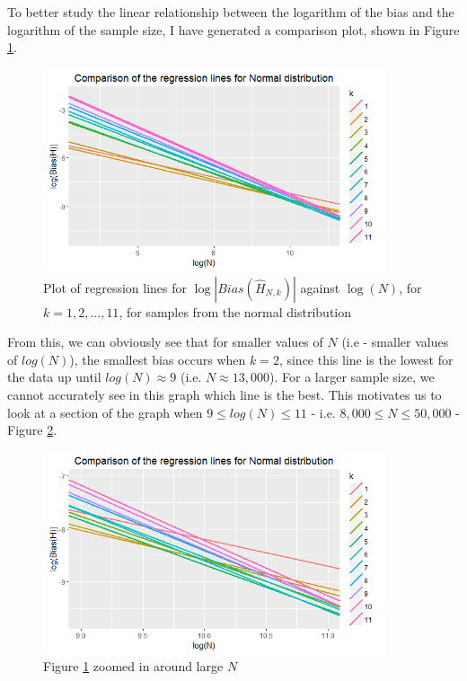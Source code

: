 \documentclass[12pt]{report}
\begin{document}
To better study the linear relationship between the logarithm of the bias and the logarithm of the sample size, I have generated a comparison plot, shown in Figure \ref{normal_comparison_graph}. 

\begin{figure}
  \begin{center}
    \includegraphics[width=0.9\textwidth]{./Graphs/Best/NormalComparison.png}
  \end{center}
\caption{Plot of regression lines for $\log|Bias(\hat{H}_{N, k})|$ against $\log(N)$, for $k=1, 2,..., 11$, for samples from the normal distribution}
  \label{normal_comparison_graph}
\end{figure}

From this, we can obviously see that for smaller values of $N$ (i.e - smaller values of $log(N)$), the smallest bias occurs when $k=2$, since this line is the lowest for the data up until $log(N) \approx 9$ (i.e. $N \approx 13,000$). For a larger sample size, we cannot accurately see in this graph which line is the best. This motivates us to look at a section of the graph when $9 \leq log(N) \leq 11$ - i.e. $8,000 \leq N \leq 50,000$ - Figure \ref{normal_comparison_graph_zoom}.

\begin{figure}
  \begin{center}
    \includegraphics[width=0.9\textwidth]{./Graphs/Best/NormalComparisonZoom.png}
  \end{center}
\caption{Figure \ref{normal_comparison_graph} zoomed in around large $N$}
  \label{normal_comparison_graph_zoom}
\end{figure}
\end{document}
